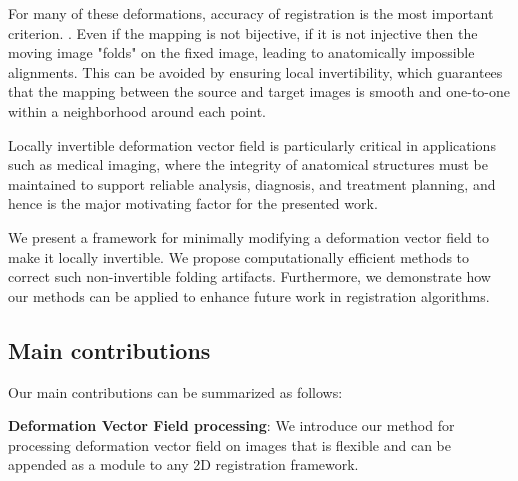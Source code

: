 \documentclass[lettersize,journal]{IEEEtran}
\begin{document}
For many of these deformations, accuracy of registration is the most important criterion. %
\cite{SENGUPTA2022174, CZOLBE2023102830, HEINRICH20121423}. 
Even if the mapping is not bijective, if it is not injective then the moving image "folds" on the fixed image, leading to anatomically impossible alignments. 
This can be avoided by ensuring local invertibility, which guarantees that the mapping between the source and target images is smooth and one-to-one within a neighborhood around each point. %

Locally invertible deformation vector field is particularly critical in applications such as medical imaging, where the integrity of anatomical structures must be maintained to support reliable analysis, diagnosis, and treatment planning, and hence is the major motivating factor for the presented work. 


We present a framework for minimally modifying a deformation vector field to make it locally invertible. We propose computationally efficient methods to correct such non-invertible folding artifacts. Furthermore, we demonstrate how our methods can be applied to enhance future work in registration algorithms.

\subsection{Main contributions}
\label{subsec:main_contributions}

Our main contributions can be summarized as follows:

\textbf{Deformation Vector Field processing}: We introduce our method for processing deformation vector field on images that is flexible and can be appended as a module to any 2D registration framework.
\end{document}

